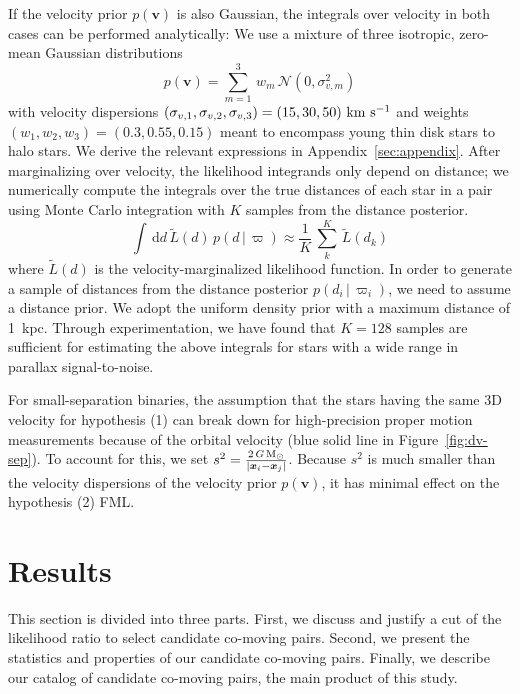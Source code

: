 \documentclass[manuscript, letterpaper]{aastex6}
\newcommand{\given}{\,|\,}
\newcommand{\dd}{\mathrm{d}}
\newcommand{\bs}[1]{\boldsymbol{#1}}
\renewcommand{\vec}[1]{\bs{#1}}
\newcommand{\kms}{\ensuremath{\rm km~s^{-1}}}
\newcommand{\msun}{{\rm M}_\odot}
\begin{document}
If the velocity prior $p(\vec{v})$ is also Gaussian, the integrals over velocity
in both cases can be performed analytically:
We use a mixture of three isotropic, zero-mean Gaussian distributions
\begin{equation}
  p(\vec{v}) = \sum_{m=1}^3 \, w_m \, \mathcal{N}(0, \sigma_{v,m}^2)
\end{equation}
with velocity dispersions $(\sigma_{v,1}, \sigma_{v,2}, \sigma_{v,3}) = (15, 30, 50)
~\kms$ and weights $(w_1,w_2,w_3) = (0.3, 0.55, 0.15)$
meant to encompass young thin disk stars to halo stars.
We derive the relevant expressions in Appendix~\ref{sec:appendix}.
After marginalizing over velocity, the likelihood integrands only depend on
distance; we numerically compute the integrals over the true distances of each
star in a pair using Monte Carlo integration with $K$ samples from
the distance posterior.
\begin{equation}
  \int \, \dd d \, \tilde{L}(d) \, p(d\given\varpi) \approx
    \frac{1}{K} \, \sum_k^K \, \tilde{L}(d_k)
\end{equation}
where $\tilde{L}(d)$ is the velocity-marginalized likelihood function.
In order to generate a sample of distances from the distance posterior $p(d_i \given \varpi_i)$,
we need to assume a distance prior. We adopt the uniform density prior
\citep{Bailer-Jones:2015aa} with a maximum distance of 1~kpc.
Through experimentation, we have found that $K=128$ samples are sufficient for
estimating the above integrals for stars with a wide range in parallax
signal-to-noise.

For small-separation binaries, the assumption that the stars having the same 3D velocity for
hypothesis (1) can
break down for high-precision proper motion measurements because of the orbital
velocity (blue solid line in Figure~\ref{fig:dv-sep}).
To account for this, we set $s^2 = \frac{2 \, G \, \msun}{|\vec{x}_i-\vec{x}_j|}$.
Because $s^2$ is much smaller than the velocity dispersions of the velocity prior
$p(\vec{v})$, it has minimal effect on the hypothesis (2) FML.


\section{Results} \label{sec:results}

This section is divided into three parts. First, we discuss and justify a cut of
the likelihood ratio to select candidate co-moving pairs.
Second, we present the statistics and properties of our candidate co-moving
pairs.
Finally, we describe our catalog of candidate co-moving pairs, the main product
of this study.
\end{document}
